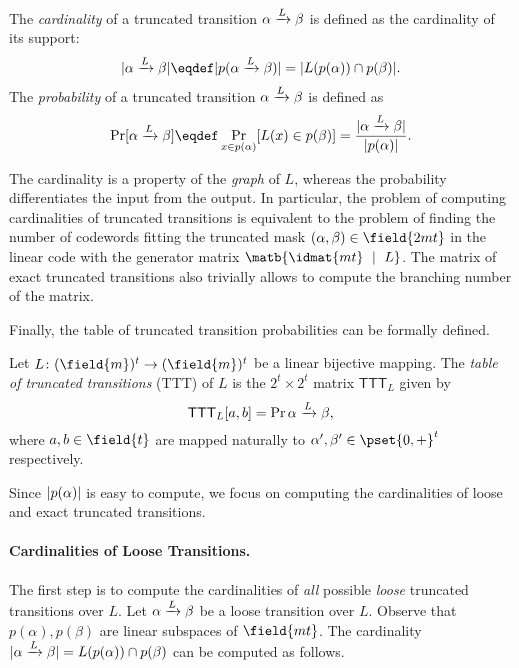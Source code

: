 \begin{definition}
The \emph{cardinality} of a truncated transition $\alpha \xrightarrow{L} \beta$ is defined as the cardinality of its support:
$$
|\alphabeta| \eqdef |p(\alphabeta)| = |L(\VA)\cap\VB|.
$$
The \emph{probability} of a truncated transition $\alpha \xrightarrow{L} \beta$ is defined as 
$$
\Pr[\alphabeta] \eqdef \Pr_{x \in \VA}[L(x) \in \VB] = \frac{|\alphabeta|}{|\VA|}.
$$
\end{definition}

\begin{remark}
The cardinality is a property of the \emph{graph} of $L$, whereas the probability differentiates the input from the output. In particular, the problem of computing cardinalities of truncated transitions is equivalent to the problem of finding the number of codewords fitting the truncated mask $(\alpha, \beta) \in \field{2mt}$ in the linear code with the generator matrix $\matb{\idmat{mt} ~\mid~ L}$. The matrix of exact truncated transitions also trivially allows to compute the branching number of the matrix.
\end{remark}

Finally, the table of truncated transition probabilities can be formally defined.

\newcommand\TTT[1]{\mathsf{TTT}_{#1}}
\begin{definition}[TTT]
Let $L\colon (\field{m})^t \to (\field{m})^t$ be a linear bijective mapping. The \emph{table of truncated transitions} (TTT) of $L$ is the $2^{t}\times 2^{t}$ matrix $\TTT{L}$ given by
$$
\TTT{L}[a,b] = \Pr{\alphabeta},
$$
where $a,b \in \field{t}$ are mapped naturally to $\alpha',\beta' \in \pset{0,\exact}^t$ respectively.
\end{definition}

Since $|p(\alpha)|$ is easy to compute, we focus on computing the cardinalities of loose and exact truncated transitions.


\paragraph{Cardinalities of Loose Transitions.}
The first step is to compute the cardinalities of \emph{all} possible \emph{loose} truncated transitions over $L$. Let $\alpha \xrightarrow{L} \beta$ be a loose transition over $L$. Observe that $p(\alpha),p(\beta)$ are linear subspaces of $\field{mt}$. 
The cardinality $|\alpha \xrightarrow{L} \beta| = L(p(\alpha)) \cap p(\beta)$ can be computed as follows.

